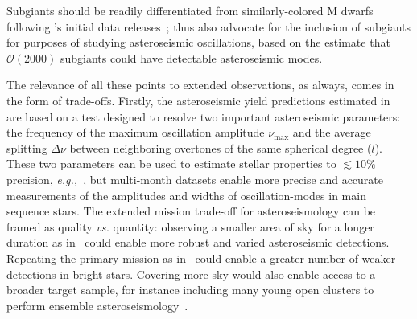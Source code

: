 Subgiants should be readily differentiated from similarly-colored M dwarfs following \gaia\!'s initial data releases~\citep{perryman_gaia_2002};
  thus also advocate for the inclusion of subgiants for purposes of studying asteroseismic oscillations, based on the estimate that $\mathcal{O}(2000)$ subgiants could have detectable asteroseismic modes.

The relevance of all these points to extended \tess observations, as always, comes in the form of trade-offs.
Firstly, the asteroseismic yield predictions estimated in~ are based on a test designed to resolve two important asteroseismic parameters: the frequency of the maximum oscillation amplitude $\nu_{\mathrm{max}}$ and the average splitting $\Delta \nu$ between neighboring overtones of the same spherical degree ($l$).
These two parameters can be used to estimate stellar properties to $\lesssim 10\%$ precision, \textit{e.g.,}~\citep{aguirre_verifying_2012}, but multi-month datasets enable more precise and accurate measurements of the amplitudes and widths of oscillation-modes in main sequence stars.
The extended mission trade-off for asteroseismology can be framed as quality \textit{vs.} quantity: observing a smaller area of sky for a longer duration as in \npole\ could enable more robust and varied asteroseismic detections.
Repeating the primary mission as in \nhemi\ could enable a greater number of weaker detections in bright stars.
Covering more sky would also enable access to a broader target sample, for instance including many young open clusters to perform ensemble asteroseismology~\citep{aerts_ensemble_2013}.

\begin{comment}
\paragraph{Measuring rotation periods for a large sample of stars}
Another reason to observing more rather than less sky is to enable measurements of rotation periods for the largest possible sample of stars.
For instance~\citet{nielsen_rotation_2013} reported rotation periods derived from starspot variability for 12151 \kepler stars.
Such studies (cf their introduction) are important for studies of stellar evolution and stellar dynamos.

They also bear upon radial velocity searches for exoplanets, in which stellar activity can effectively `mask' planetary orbital periods commensurate with the stellar rotation period.
The matters for prospects of detecting small planets in the habitable zones of M dwarfs~\citep{newton_HZ_2016}.

THIS ALSO MATTERS FOR STELLAR ACTIVITY STUDIES.
Long timescale characterization of stellar activity
E.g. through spot detection, or other indicators of stellar magnetic activity.
\end{comment}

